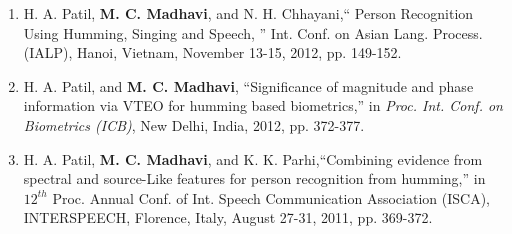 \documentclass[10pt]{article}
\begin{document}
\begin{enumerate}[resume]
\item  H. A. Patil, \textbf{M. C. Madhavi}, and N. H. Chhayani,``
Person Recognition Using Humming, Singing and Speech, '' Int. Conf. on Asian Lang. Process. (IALP), Hanoi, Vietnam,  November 13-15, 2012, pp. 149-152. 
\item H. A. Patil, and \textbf{M. C. Madhavi}, ``Significance of magnitude and phase information via VTEO for humming based biometrics,'' in
\textit{Proc. Int. Conf. on Biometrics (ICB)}, New Delhi, India, 2012, pp. 372-377.

\item H. A. Patil, \textbf{M. C. Madhavi}, and K. K. Parhi,``Combining evidence from spectral and source-Like features for person recognition from humming,'' in $ 12^{th} $ Proc. Annual  Conf. of Int. Speech Communication Association (ISCA), INTERSPEECH,  Florence, Italy, August 27-31, 2011, pp. 369-372. 
\end{enumerate}
\end{document}
